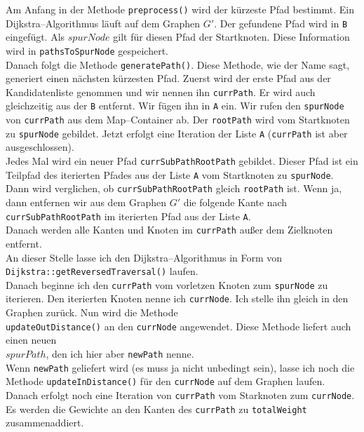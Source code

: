 \documentclass[a4paper,10pt,ngerman]{scrartcl}
\begin{document}
Am Anfang in der Methode \texttt{preprocess()} wird der kürzeste Pfad bestimmt. Ein Dijkstra--Algorithmus läuft
auf dem Graphen $G'$. Der gefundene Pfad wird in \texttt{B} eingefügt. Als $spurNode$ gilt für diesen Pfad
der Startknoten. Diese Information wird in \texttt{pathsToSpurNode} gespeichert.\\

Danach folgt die Methode \texttt{generatePath()}. Diese Methode, wie der Name sagt, generiert einen nächsten
kürzesten Pfad. Zuerst wird der erste Pfad aus der Kandidatenliste genommen und wir nennen ihn \texttt{currPath}.
Er wird auch gleichzeitig aus der \texttt{B} entfernt.
Wir fügen ihn in \texttt{A} ein. Wir rufen den \texttt{spurNode} von \texttt{currPath} aus dem Map--Container ab.
Der \texttt{rootPath} wird vom Startknoten zu \texttt{spurNode} gebildet. Jetzt erfolgt eine Iteration der Liste \texttt{A} 
(\texttt{currPath} ist aber ausgeschlossen).\\
Jedes Mal wird ein neuer Pfad \texttt{currSubPathRootPath} gebildet.
Dieser Pfad ist ein Teilpfad des iterierten Pfades aus der Liste \texttt{A} vom Startknoten zu \texttt{spurNode}.
Dann wird verglichen, ob \texttt{currSubPathRootPath} gleich \texttt{rootPath} ist. Wenn ja, dann
entfernen wir aus dem Graphen $G'$ die folgende Kante 
nach\\ \texttt{currSubPathRootPath} im iterierten Pfad aus der Liste \texttt{A}.\\ 
Danach werden alle Kanten und Knoten im \texttt{currPath} außer dem Zielknoten entfernt.\\
An dieser Stelle lasse ich den Dijkstra--Algorithmus in Form von 
\texttt{Dijkstra::getReversedTraversal()} laufen.\\
Danach beginne ich den \texttt{currPath} vom vorletzen Knoten zum \texttt{spurNode} zu iterieren.
Den iterierten Knoten nenne ich \texttt{currNode}. Ich stelle ihn gleich in den Graphen zurück.
Nun wird die Methode\\ \texttt{updateOutDistance()} an den \texttt{currNode} angewendet.
Diese Methode liefert auch einen neuen\\
$spurPath$, den ich hier aber \texttt{newPath} nenne.\\
Wenn \texttt{newPath} geliefert wird (es muss ja nicht unbedingt sein), 
lasse ich noch die Methode \texttt{updateInDistance()} für den \texttt{currNode} auf dem Graphen laufen.\\
Danach erfolgt noch eine Iteration von \texttt{currPath} vom Starknoten zum \texttt{currNode}.
Es werden die Gewichte an den Kanten des \texttt{currPath} zu \texttt{totalWeight} zusammenaddiert.
\end{document}
